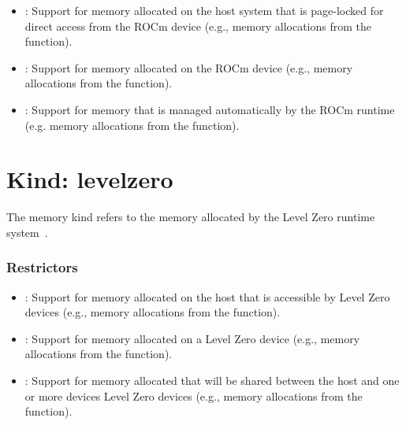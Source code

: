 \begin{itemize}

\item {}: Support for memory allocated on the host system that
    is page-locked for direct access from the ROCm device (e.g., memory
        allocations from the  function).

\item {}: Support for memory allocated on the ROCm device
    (e.g., memory allocations from the  function).

\item {}: Support for memory that is managed automatically
    by the ROCm runtime (e.g. memory allocations from the
         function).

\end{itemize}

\section{Kind: levelzero}

The  memory kind refers to the memory allocated by the
Level Zero runtime system~\cite{zeref}.

\subsubsection{Restrictors}

\begin{itemize}

\item {}: Support for memory allocated on the host that is
    accessible by Level Zero devices (e.g., memory allocations from the
         function).

\item {}: Support for memory allocated on a Level Zero device
    (e.g., memory allocations from the  function). 

\item {}: Support for memory allocated that will be shared
    between the host and one or more devices Level Zero devices (e.g.,
        memory allocations from the  function).

\end{itemize}
